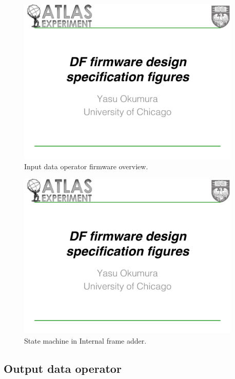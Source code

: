 \documentclass[11pt,letterpaper]{article}
\begin{document}
\begin{figure}[h!]
  \centering
  \includegraphics[width=0.95\textwidth,clip,page=7]{figures.pdf}
  \caption{Input data operator firmware overview.}
  \label{fig:INPUT_DATA_OPERATOR_OVERVIEW}
\end{figure}

\begin{figure}[h!]
  \centering
  \includegraphics[width=0.95\textwidth,clip,page=8]{figures.pdf}
  \caption{State machine in Internal frame adder.}
  \label{fig:STATE_MACHINE_FRAME_ADDER}
\end{figure}

\subsection{Output data operator}
\end{document}
